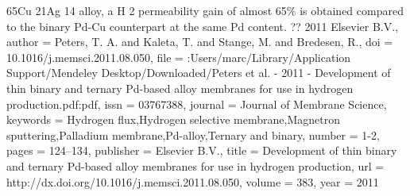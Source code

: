{{                        65Cu
                        21Ag
                        14 alloy, a H
                        2 permeability gain of almost 65{\%} is obtained compared to the binary Pd-Cu counterpart at the same Pd content. ?? 2011 Elsevier B.V.},
author = {Peters, T. A. and Kaleta, T. and Stange, M. and Bredesen, R.},
doi = {10.1016/j.memsci.2011.08.050},
file = {:Users/marc/Library/Application Support/Mendeley Desktop/Downloaded/Peters et al. - 2011 - Development of thin binary and ternary Pd-based alloy membranes for use in hydrogen production.pdf:pdf},
issn = {03767388},
journal = {Journal of Membrane Science},
keywords = {Hydrogen flux,Hydrogen selective membrane,Magnetron sputtering,Palladium membrane,Pd-alloy,Ternary and binary},
number = {1-2},
pages = {124--134},
publisher = {Elsevier B.V.},
title = {{Development of thin binary and ternary Pd-based alloy membranes for use in hydrogen production}},
url = {http://dx.doi.org/10.1016/j.memsci.2011.08.050},
volume = {383},
year = {2011}
}
